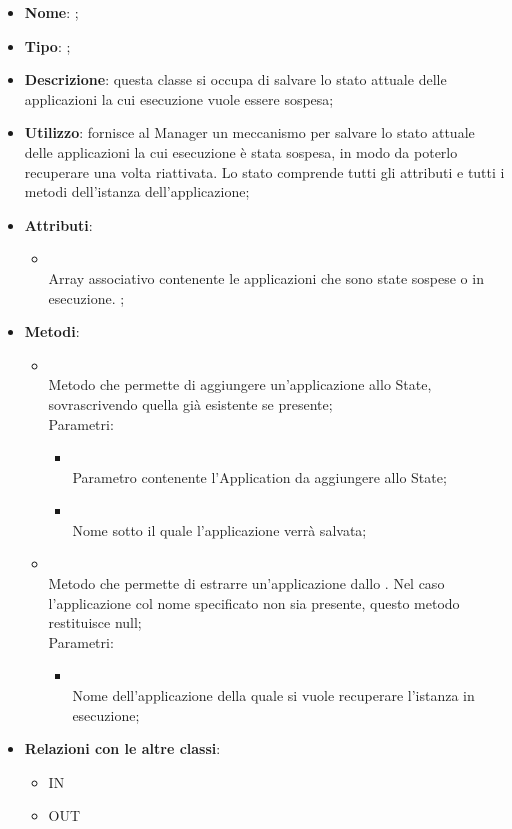 \begin{itemize}
	\item \textbf{Nome}: ;
	\item \textbf{Tipo}: ;
	\item \textbf{Descrizione}: questa classe si occupa di salvare lo stato attuale delle applicazioni la cui esecuzione vuole essere sospesa;
	\item \textbf{Utilizzo}: fornisce al Manager un meccanismo per salvare lo stato attuale delle applicazioni la cui esecuzione è stata sospesa, in modo da poterlo recuperare una volta riattivata. Lo stato comprende tutti gli attributi e tutti i metodi dell'istanza dell'applicazione;
	\item \textbf{Attributi}:
	\begin{itemize}
		\item[]  \\
		Array associativo contenente le applicazioni che sono state sospese o in esecuzione. ;
	\end{itemize}
	\item \textbf{Metodi}:
	\begin{itemize}
		\item[]  \\
		Metodo che permette di aggiungere un'applicazione allo State, sovrascrivendo quella già esistente se presente;\\
		Parametri:
		\begin{itemize}
			\item {} \\
			Parametro contenente l'Application da aggiungere allo State;
			\item {} \\
			Nome sotto il quale l'applicazione verrà salvata;
		\end{itemize}
		\item[]  \\
		Metodo che permette di estrarre un'applicazione dallo . Nel caso l'applicazione col nome specificato non sia presente, questo metodo restituisce null;\\
		Parametri:
		\begin{itemize}
			\item {} \\
			Nome dell'applicazione della quale si vuole recuperare l'istanza in esecuzione;
		\end{itemize}
	\end{itemize}
	\item \textbf{Relazioni con le altre classi}:
	\begin{itemize}
		\item IN \hyperlink{Manager_label}{}
		\item OUT \hyperlink{Application_label}{}
	\end{itemize}
\end{itemize}
\FloatBarrier

